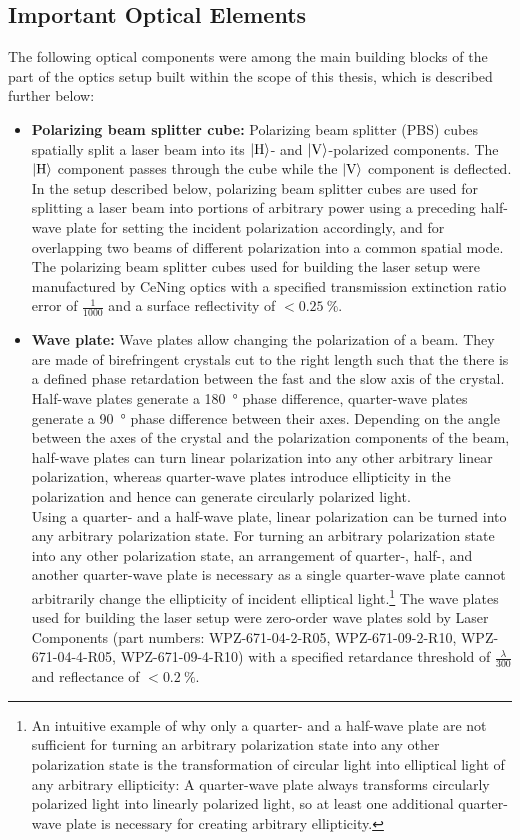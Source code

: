 \subsection*{Important Optical Elements}
The following optical components were among the main building blocks of the part of the optics setup built within the scope of this thesis, which is described further below:
\begin{itemize}
    \item \textbf{Polarizing beam splitter cube:} Polarizing beam splitter (PBS) cubes spatially split a laser beam into its $\Ket{\text{H}}$- and $\Ket{\text{V}}$-polarized components. The $\Ket{\text{H}}$ component passes through the cube while the $\Ket{\text{V}}$ component is deflected. In the setup described below, polarizing beam splitter cubes are used for splitting a laser beam into portions of arbitrary power using a preceding half-wave plate for setting the incident polarization accordingly, and for overlapping two beams of different polarization into a common spatial mode. The polarizing beam splitter cubes used for building the laser setup were manufactured by CeNing optics with a specified transmission extinction ratio error of $\frac{1}{1000}$ and a surface reflectivity of $<\SI{0.25}{\percent}$.
    
    \item \textbf{Wave plate:} Wave plates allow changing the polarization of a beam. They are made of birefringent crystals cut to the right length such that the there is a defined phase retardation between the fast and the slow axis of the crystal. Half-wave plates generate a \SI{180}{\degree} phase difference, quarter-wave plates generate a \SI{90}{\degree} phase difference between their axes. Depending on the angle between the axes of the crystal and the polarization components of the beam, half-wave plates can turn linear polarization into any other arbitrary linear polarization, whereas quarter-wave plates introduce ellipticity in the polarization and hence can generate circularly polarized light.\\
    Using a quarter- and a half-wave plate, linear polarization can be turned into any arbitrary polarization state. For turning an arbitrary polarization state into any other polarization state, an arrangement of quarter-, half-, and another quarter-wave plate is necessary as a single quarter-wave plate cannot arbitrarily change the ellipticity of incident elliptical light.\footnote{An intuitive example of why only a quarter- and a half-wave plate are not sufficient for turning an arbitrary polarization state into any other polarization state is the transformation of circular light into elliptical light of any arbitrary ellipticity: A quarter-wave plate always transforms circularly polarized light into linearly polarized light, so at least one additional quarter-wave plate is necessary for creating arbitrary ellipticity.} The wave plates used for building the laser setup were zero-order wave plates sold by Laser Components (part numbers:  WPZ-671-04-2-R05, WPZ-671-09-2-R10, WPZ-671-04-4-R05,  WPZ-671-09-4-R10) with a specified retardance threshold of $\frac{\lambda}{300}$ and reflectance of $<\SI{0.2}{\percent}$.
    

\end{itemize}
